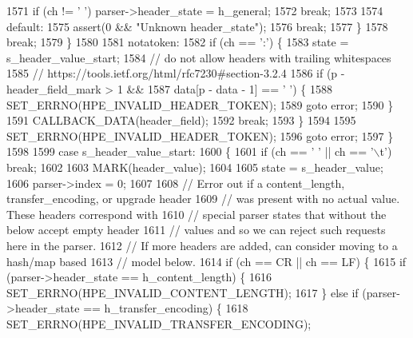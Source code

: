 \begin{DoxyCode}
1571               \textcolor{keywordflow}{if} (ch != \textcolor{charliteral}{' '}) parser->header_state = h_general;
1572               \textcolor{keywordflow}{break};
1573 
1574             \textcolor{keywordflow}{default}:
1575               assert(0 && \textcolor{stringliteral}{"Unknown header\_state"});
1576               \textcolor{keywordflow}{break};
1577           \}
1578           \textcolor{keywordflow}{break};
1579         \}
1580 
1581         notatoken:
1582         \textcolor{keywordflow}{if} (ch == \textcolor{charliteral}{':'}) \{
1583           state = s_header_value_start;
1584           \textcolor{comment}{// do not allow headers with trailing whitespaces}
1585           \textcolor{comment}{// https://tools.ietf.org/html/rfc7230#section-3.2.4}
1586           \textcolor{keywordflow}{if} (p - header\_field\_mark > 1 &&
1587               data[p - data - 1] == \textcolor{charliteral}{' '}) \{
1588             SET_ERRNO(HPE_INVALID_HEADER_TOKEN);
1589             \textcolor{keywordflow}{goto} error;
1590           \}
1591           CALLBACK_DATA(header\_field);
1592           \textcolor{keywordflow}{break};
1593         \}
1594 
1595         SET_ERRNO(HPE_INVALID_HEADER_TOKEN);
1596         \textcolor{keywordflow}{goto} error;
1597       \}
1598 
1599       \textcolor{keywordflow}{case} s_header_value_start:
1600       \{
1601         \textcolor{keywordflow}{if} (ch == \textcolor{charliteral}{' '} || ch == \textcolor{charliteral}{'\(\backslash\)t'}) \textcolor{keywordflow}{break};
1602 
1603         MARK(header\_value);
1604 
1605         state = s_header_value;
1606         parser->index = 0;
1607 
1608         \textcolor{comment}{// Error out if a content\_length, transfer\_encoding, or upgrade header}
1609         \textcolor{comment}{// was present with no actual value.  These headers correspond with}
1610         \textcolor{comment}{// special parser states that without the below accept empty header}
1611         \textcolor{comment}{// values and so we can reject such requests here in the parser.}
1612         \textcolor{comment}{// If more headers are added, can consider moving to a hash/map based}
1613         \textcolor{comment}{// model below.}
1614         \textcolor{keywordflow}{if} (ch == CR || ch == LF) \{
1615           \textcolor{keywordflow}{if} (parser->header_state == h_content_length) \{
1616             SET_ERRNO(HPE_INVALID_CONTENT_LENGTH);
1617           \} \textcolor{keywordflow}{else} \textcolor{keywordflow}{if} (parser->header_state == h_transfer_encoding) \{
1618             SET_ERRNO(HPE_INVALID_TRANSFER_ENCODING);

\end{DoxyCode}
